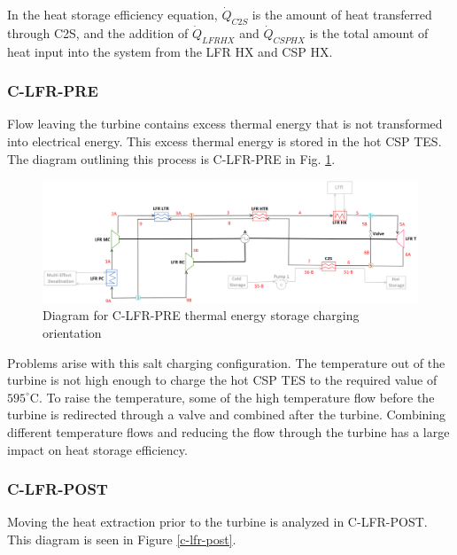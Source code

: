 \begin{paracol}{2}
In the heat storage efficiency equation, $\dot{Q}_{C2S}$ is the amount of heat transferred through C2S, and the addition of $\dot{Q}_{LFRHX}$ and $\dot{Q}_{CSPHX}$ is the total amount of heat input into the system from the LFR HX and CSP HX. 

\subsubsection{C-LFR-PRE} 

Flow leaving the turbine contains excess thermal energy that is not transformed into electrical energy. This excess thermal energy is stored in the hot CSP TES. The diagram outlining this process is C-LFR-PRE in Fig. \ref{c-lfr-pre}. 


\end{paracol}
\begin{figure}[H]
    \widefigure
    \includegraphics[width=\linewidth]{Definitions/c-lfr-pre.pdf}
    \caption{Diagram for C-LFR-PRE thermal energy storage charging orientation\label{c-lfr-pre}}
\end{figure}
\begin{paracol}{2}
\linenumbers
\switchcolumn

Problems arise with this salt charging configuration. The temperature out of the turbine is not high enough to charge the hot CSP TES to the required value of $595^{\circ}$C. To raise the temperature, some of the high temperature flow before the turbine is redirected through a valve and combined after the turbine. Combining different temperature flows and reducing the flow through the turbine has a large impact on heat storage efficiency. 



\subsubsection{C-LFR-POST} 

Moving the heat extraction prior to the turbine is analyzed in C-LFR-POST. This diagram is seen in Figure \ref{c-lfr-post}.

\end{paracol}
